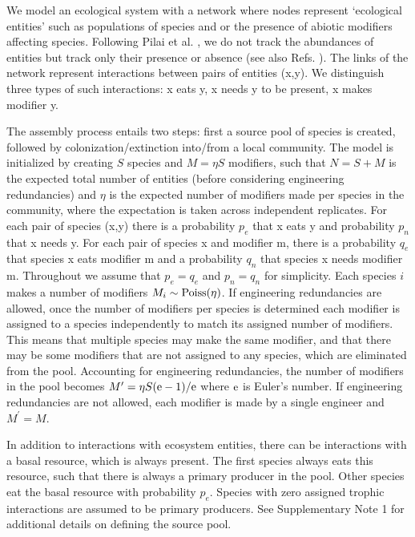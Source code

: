 \documentclass[twocolumn,preprintnumbers,amsmath,amssymb,superscriptaddress,linenumbers]{revtex4-1}
\newcommand{\rr}[1]{{\rm #1}}
\providecommand{\DIFaddbegin}{} %
\providecommand{\DIFdelend}{} %
\newcommand{\DIFaddincludegraphics}[2][]{{\color{blue}\fbox{\DIFOincludegraphics[#1]{#2}}}} %
\DeclareRobustCommand{\DIFaddbegin}{\DIFOaddbegin \let\includegraphics\DIFaddincludegraphics} %
\DeclareRobustCommand{\DIFdelend}{\DIFOaddend \let\includegraphics\DIFOincludegraphics} %
\begin{document}
\DIFdelend \DIFaddbegin \footnotesize{
  We model an ecological system with a network where nodes represent `ecological entities' such as populations of species and or the presence of abiotic modifiers affecting species.
  Following Pilai et al. \cite{Pillai2011}, we do not track the abundances of entities but track only their presence or absence (see also Refs. \cite{Luh1993,Campbell2011}).
  The links of the network represent interactions between pairs of entities (x,y).
  We distinguish three types of such interactions: x eats y, x needs y to be present, x makes modifier y.

  The assembly process entails two steps: first a source pool of species is created, followed by colonization/extinction into/from a local community.
  The model is initialized by creating $S$ species and $M = \eta S$ modifiers, such that $N=S+M$ is the expected total number of entities (before considering engineering redundancies) and $\eta$ is the expected number of modifiers made per species in the community, where the expectation is taken across independent replicates.
  For each pair of species (x,y) there is a probability $p_e$ that x eats y and probability $p_n$ that x needs y.
  For each pair of species x and modifier m, there is a probability $q_e$ that species x eats modifier m and a probability $q_n$ that species x needs modifier m.
  Throughout we assume that $p_e = q_e$ and $p_n = q_n$ for simplicity.
  Each species $i$ makes a number of modifiers $M_i \sim \rr{Poiss}(\eta)$. %
  If engineering redundancies are allowed, once the number of modifiers per species is determined each modifier is assigned to a species independently to match its assigned number of modifiers.
  This means that multiple species may make the same modifier, and that there may be some modifiers that are not assigned to any species, which are eliminated from the pool.
  Accounting for engineering redundancies, the number of modifiers in the pool becomes $M^\prime = \eta S (\rr{e}-1)/\rr{e}$ where $\rr{e}$ is Euler's number.
  If engineering redundancies are not allowed, each modifier is made by a single engineer and $M^\prime = M$.

  In addition to interactions with ecosystem entities, there can be interactions with a basal resource, which is always present.
  The first species always eats this resource, such that there is always a primary producer in the pool.
  Other species eat the basal resource with probability $p_e$.
  Species with zero assigned trophic interactions are assumed to be primary producers.
  See Supplementary Note 1 for additional details on defining the source pool.

}
\end{document}
